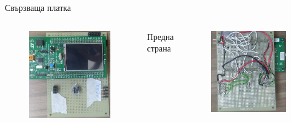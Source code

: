 \documentclass{beamer}
\begin{document}
\begin{frame}{Свързваща платка}
		\begin{columns}
			\pause
		\begin{figure}[htpb!]
			\centering
			\includegraphics[width=1\textwidth]{Images/pcb2.png}
		\end{figure}

		Предна страна 
		\pause
		\begin{figure}[htpb!]
			\centering
			\includegraphics[width=1\textwidth]{Images/pcb1.png}
		\end{figure}


\end{columns}
\end{frame}
\end{document}
